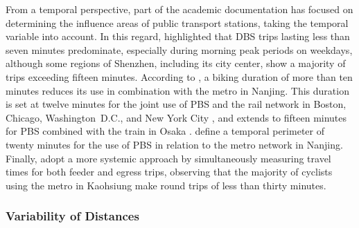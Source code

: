 \begin{refsegment}
From a temporal perspective, part of the academic documentation has focused on determining the influence areas of public transport stations, taking the temporal variable into account. In this regard, \textcolor{blue}{\textcite[18, 21]{li_factors_2020}} highlighted that \acrshort{DBS} trips lasting less than seven minutes predominate, especially during morning peak periods on weekdays, although some regions of Shenzhen, including its city center, show a majority of trips exceeding fifteen minutes. According to \textcolor{blue}{\textcite[128]{liu_understanding_2020}}, a biking duration of more than ten minutes reduces its use in combination with the metro in Nanjing. This duration is set at twelve minutes for the joint use of \acrshort{PBS} and the rail network in Boston, Chicago, Washington~D.C., and New York City \textcolor{blue}{\autocite[9]{kong_deciphering_2020}}, and extends to fifteen minutes for \acrshort{PBS} combined with the train in Osaka \textcolor{blue}{\autocite[3415]{tomita_demand_2017}}. \textcolor{blue}{\textcite[5]{yang_empirical_2016}} define a temporal perimeter of twenty minutes for the use of \acrshort{PBS} in relation to the metro network in Nanjing. Finally, \textcolor{blue}{\textcite[1696]{cheng_evaluating_2012}} adopt a more systemic approach by simultaneously measuring travel times for both feeder and egress trips, observing that the majority of cyclists using the metro in Kaohsiung make round trips of less than thirty minutes.%

\subsubsection*{Variability of Distances
    \label{chap2:variabilite-distances}
    }


\end{refsegment}
